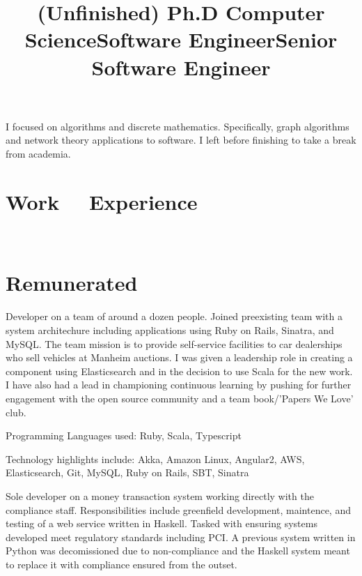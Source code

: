 \documentclass[margintitle,line]{res}
\renewcommand{\subsection}[1]{\section{\normalfont #1}}
\begin{document}
\begin{resume}
\title{(Unfinished) Ph.D Computer Science}
\begin{position}
I focused on algorithms and discrete mathematics. Specifically, graph
algorithms and network theory applications to software. I left before
finishing to take a break from academia.
\end{position}

\section{Work \ \ Experience}
\ \\
\subsection{Remunerated}

\title{Software Engineer}
\begin{position}
  Developer on a team of around a dozen people. Joined preexisting team with a
  system architechure including applications using Ruby on Rails, Sinatra, and
  MySQL. The team mission is to provide self-service facilities to car
  dealerships who sell vehicles at Manheim auctions. I was given a leadership
  role in creating a component using Elasticsearch and in the decision to use
  Scala for the new work. I have also had a lead in championing
  continuous learning by pushing for further engagement with the open source
  community and a team book/'Papers We Love' club.

  Programming Languages used:
  Ruby, Scala, Typescript

  Technology highlights include:
  Akka, Amazon Linux, Angular2, AWS, Elasticsearch, Git, MySQL, Ruby on Rails, SBT, Sinatra
\end{position}

\title{Senior Software Engineer}
\begin{position}
  Sole developer on a money transaction system working directly with the
  compliance staff. Responsibilities include greenfield
  development, maintence, and testing of a web service written in Haskell. Tasked
  with ensuring systems developed meet regulatory standards including PCI. A
  previous system written in Python was decomissioned due to non-compliance and
  the Haskell system meant to replace it with compliance ensured from the outset.


\end{position}
\end{resume}
\end{document}
